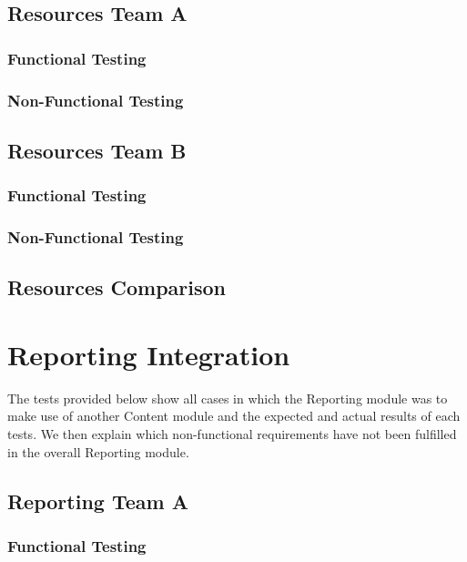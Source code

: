\documentclass[12pt, oneside]{article}
\begin{document}
	\subsection{Resources Team A}	
		\subsubsection{Functional Testing}
			
		\subsubsection{Non-Functional Testing }
			
	
	\subsection{Resources Team B}	
		\subsubsection{Functional Testing}
			
		\subsubsection{Non-Functional Testing }
			
			
	
	\subsection{Resources Comparison}
	
	
\newpage 
\section{Reporting Integration}
The tests provided below show all cases in which the Reporting module was to make use of another Content module and the expected and actual results of each tests. We then explain which non-functional requirements have not been fulfilled in the overall Reporting module.
	\subsection{Reporting Team A}	
		\subsubsection{Functional Testing}
			
\end{document}
